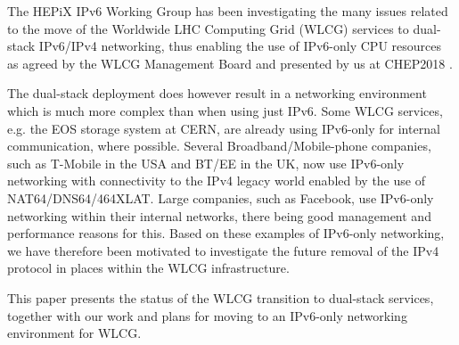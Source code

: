 

 


The HEPiX IPv6 Working Group \cite{ipv6wg} has been investigating the many issues related to the 
move of the Worldwide LHC Computing Grid (WLCG) services to dual-stack IPv6/IPv4 networking, thus enabling the use of
IPv6-only CPU resources as agreed by the WLCG Management Board and presented by us at 
CHEP2018 \cite{ipv6-chep2018}. 

The dual-stack deployment does however result in a networking environment
which is much more complex than when using just IPv6. Some WLCG services, e.g.
the EOS storage system at CERN, are already using IPv6-only for internal communication,
where possible. Several Broadband/Mobile-phone companies, such as T-Mobile in the USA and
BT/EE in the UK, now use IPv6-only networking with connectivity to the IPv4
legacy world enabled by the use of NAT64/DNS64/464XLAT. Large companies, such
as Facebook, use IPv6-only networking within their internal networks, there
being good management and performance reasons for this. Based on these examples
of IPv6-only networking, we have therefore been motivated to investigate the future removal of the IPv4 protocol in
places within the WLCG infrastructure.

This paper presents the status of the WLCG transition to dual-stack services, together with 
our work and plans for moving to an IPv6-only networking environment for WLCG.


